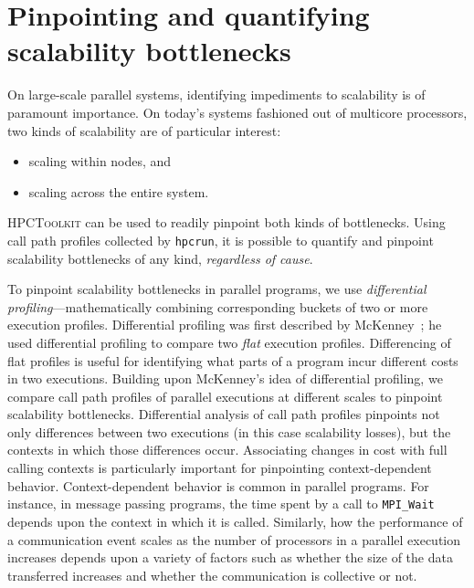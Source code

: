 \documentclass[12pt]{article}
\newcommand{\HPCToolkit}{\textsc{HPCToolkit}}
\begin{document}
\section{Pinpointing and quantifying scalability bottlenecks}

On large-scale parallel systems,  identifying impediments to scalability is of paramount importance. On today's systems fashioned out of multicore processors, two kinds of scalability are of particular interest: 
\begin{itemize}
\item scaling within nodes, and
\item scaling across the entire system. 
\end{itemize}
\HPCToolkit{} can be used to readily pinpoint both kinds of bottlenecks. Using call path profiles collected by {\tt hpcrun}, it is possible to quantify and pinpoint scalability bottlenecks of any kind, {\em regardless of cause}.

To pinpoint scalability bottlenecks in parallel programs, we use {\em differential profiling}---mathematically combining corresponding buckets of two or more execution profiles. Differential profiling was first described by McKenney~\cite{mckenney98}; he used differential profiling to compare two {\em flat} execution profiles. Differencing of flat profiles is useful for identifying what parts of a program  incur different costs in two executions. Building upon McKenney's idea of differential profiling, we  compare call path profiles of parallel executions at different scales to pinpoint scalability bottlenecks. Differential analysis of call path profiles pinpoints not only differences  between two executions (in this case scalability losses), but the contexts in which those differences occur. Associating changes in cost with full calling contexts is particularly important for pinpointing context-dependent behavior. Context-dependent behavior is common in parallel programs. For instance, in message passing programs, the time spent by a call to {\tt MPI\_Wait} depends upon the context in which it is called. Similarly, how the performance of a communication event scales as the number of processors in a parallel execution increases depends upon a variety of factors such as whether the size of the data transferred increases and whether the communication is collective or not.
\end{document}

